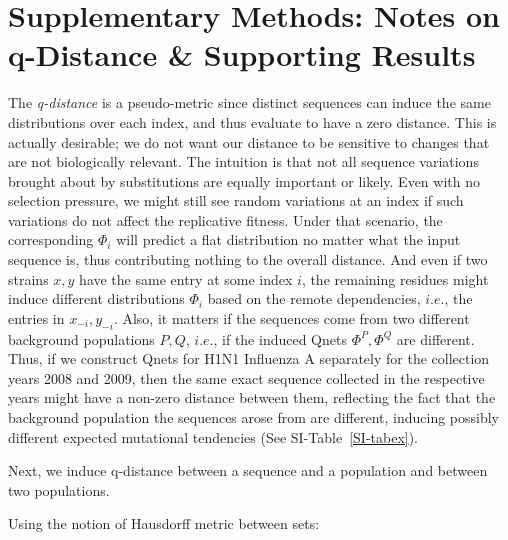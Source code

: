 \documentclass[onecolumn, compsoc,10pt]{IEEEtran}
\begin{document}





\clearpage






\section*{Supplementary Methods: Notes on q-Distance \& Supporting Results}

The \textit{q-distance} is a pseudo-metric since  distinct sequences can induce the same distributions over each index, and thus evaluate to have a zero distance. This is  actually desirable; we do not want our distance to be  sensitive to changes that are not biologically relevant. The intuition is that  not all sequence variations brought about by substitutions are equally important or likely. Even with no  selection pressure, we might still see random  variations at an index if such variations do not affect the replicative fitness. Under that scenario, the corresponding $\Phi_i$ will predict a flat distribution no matter what the input sequence is, thus contributing nothing to the overall distance. And even if two strains $x,y$ have the same entry at some index $i$, the remaining residues  might induce different distributions $\Phi_i$ based on the remote dependencies, $i.e.$, the entries in $x_{-i},y_{-i}$. Also, it matters if the sequences come from two different background populations $P,Q$, $i.e.$, if the induced Qnets $\Phi^P,\Phi^Q$ are different. Thus, if we construct Qnets for H1N1 Influenza A separately for the collection years 2008 and 2009, then the same exact sequence collected in the respective years might have a non-zero distance between them, reflecting the fact that the background population the sequences arose from are different, inducing possibly different expected mutational tendencies (See SI-Table~\ref{SI-tabex}).

Next, we induce q-distance  between a sequence and a population and between two populations.
\begin{defn}
Using the notion of Hausdorff metric between sets:
\end{defn}
\end{document}
